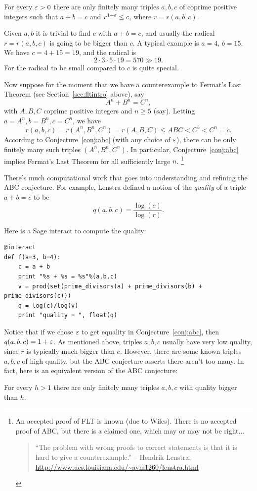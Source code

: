 \documentclass{book}
\begin{document}
\begin{conjecture}\label{conj:abc}
For every $\varepsilon>0$ there are only finitely many
triples $a,b,c$ of coprime positive integers such
that $a+b=c$ and $r^{1+\varepsilon}\leq c$,
where $r=r(a,b,c)$.
\end{conjecture}

Given $a,b$ it is trivial to find $c$ with $a+b=c$, and
usually the radical $r=r(a,b,c)$ is going to be bigger
than $c$.   A typical example is $a=4$, $b=15$.
We have $c=4+15=19$, and the radical is
$$2\cdot 3\cdot5\cdot19=570 \gg 19.$$
For the radical to be small compared to $c$
is quite special.

Now suppose for the moment that we have a counterexample
to Fermat's Last Theorem (see Section~\ref{sec:fltintro} above),
say
$$
 A^n + B^n = C^n,
$$
with $A,B,C$ coprime positive integers and $n\ge 5$ (say).
Letting $a=A^n, b=B^n, c=C^n$, we have
$$
r(a,b,c) = r(A^n,B^n,C^n) = r(A,B,C) \leq ABC <C^3 < C^n=c.
$$
According to Conjecture~\ref{conj:abc} (with
any choice of $\varepsilon$), there can be only finitely many such
triples $(A^n, B^n, C^n)$.  In particular, Conjecture~\ref{conj:abc} implies
Fermat's Last Theorem for all sufficiently large $n$.
\footnote{An accepted proof of FLT is known (due to Wiles). There
is no accepted proof of ABC, but there is a claimed one,
which may or may not be right...
\begin{quote}
``The problem with wrong proofs to correct statements is that it is hard to give a counterexample.'' -- Hendrik Lenstra, \url{http://www.ucs.louisiana.edu/~avm1260/lenstra.html}
\end{quote}}

There's much computational work that goes into understanding
and refining the ABC conjecture.  For example,
Lenstra defined a notion of the {\em quality} of
a triple $a+b=c$ to be
$$q(a,b,c) = \frac{\log(c)}{\log(r)}.$$

Here is a Sage interact to compute the quality:
\begin{lstlisting}
@interact
def f(a=3, b=4):
    c = a + b
    print "%s + %s = %s"%(a,b,c)
    v = prod(set(prime_divisors(a) + prime_divisors(b) + prime_divisors(c)))
    q = log(c)/log(v)
    print "quality = ", float(q)
\end{lstlisting}

Notice that if we chose $\varepsilon$ to get equality
in Conjecture~\ref{conj:abc}, then
$q(a,b,c) = 1+\varepsilon$.
As mentioned above, triples $a,b,c$ usually have
very low quality, since
$r$ is typically much bigger than $c$.
However, there are some known triples $a,b,c$ of
high quality, but the ABC conjecture asserts there aren't too
many.  In fact, here is an equivalent version of the ABC conjecture:
\begin{conjecture}
For every $h>1$ there are only finitely many triples
$a,b,c$ with quality bigger than $h$.
\end{conjecture}
\end{document}

